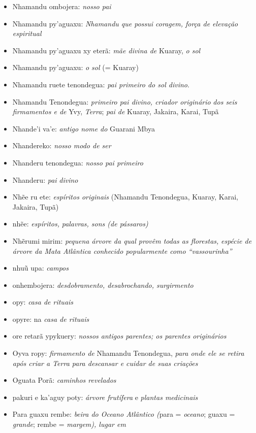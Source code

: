 \begin{itemize}
\item
  Nhamandu ombojera: \emph{nosso pai}
\item
  Nhamandu py'aguaxu: \emph{Nhamandu que possui coragem, força de
  elevação espiritual}
\item
  Nhamandu py'aguaxu xy eterã: \emph{mãe divina de} Kuaray, \emph{o sol}
\item
  Nhamandu py'aguaxu: \emph{o sol} (= Kuaray)
\item
  Nhamandu ruete tenondegua: \emph{pai primeiro do sol divino}.
\item
  Nhamandu Tenondegua: \emph{primeiro pai divino, criador
  originário} \emph{dos seis firmamentos e de} Yvy,
  \emph{Terra}; \emph{pai de} Kuaray,{} Jakaira, Karai, Tupã
\item
  Nhande'i va'e: \emph{antigo nome do} Guarani Mbya
\item
  Nhandereko: \emph{nosso modo de ser}
\item
  Nhanderu tenondegua: \emph{nosso pai primeiro}
\item
  Nhanderu: \emph{pai} \emph{divino}
\item
  Nhẽe ru ete: \emph{espíritos originais} (Nhamandu Tenondegua, Kuaray,
  Karai, Jakaira, Tupã)
\item
  nhẽe: \emph{espíritos,} \emph{palavras, sons (de pássaros)}
\item
  Nhẽrumi mirim: \emph{pequena árvore da qual provêm todas as
  florestas,} \emph{espécie de árvore da Mata Atlântica conhecido
  popularmente como ``vassourinha''}
\item
  nhuũ upa: \emph{campos}
\item
  onhembojera: \emph{desdobramento, desabrochando, surgirmento}
\item
  opy: \emph{casa de rituais}
\item
  opyre: na \emph{casa de rituais}
\item
  ore retarã ypykuery: \emph{nossos antigos parentes; os parentes
  originários}
\item
  Oyva ropy: \emph{firmamento de} Nhamandu Tenondegua, \emph{para onde
  ele se retira após criar a Terra para descansar e cuidar de suas
  criações}
\item
  Oguata Porã: \emph{caminhos revelados}
\item
  pakuri e ka'aguy poty: \emph{árvore frutífera} e \emph{plantas
  medicinais}
\item
  Para guaxu rembe: \emph{beira do Oceano Atlântico (}para =
  \emph{oceano}; guaxu = \emph{grande}; rembe = \emph{margem), lugar em}

\end{itemize}
